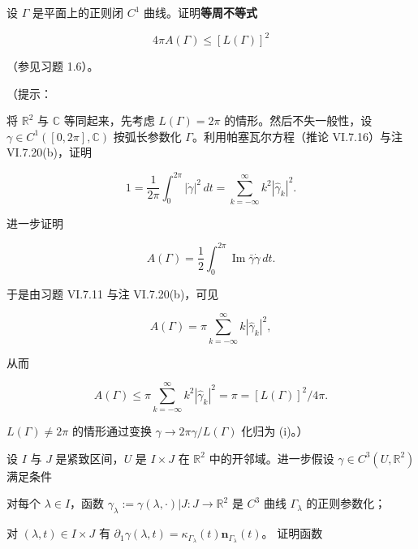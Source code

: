 \begin{exercises}
\item

设 $ \Gamma $ 是平面上的正则闭 $ C^{1} $ 曲线。证明\textbf{等周不等式}

\[
4\pi A(\Gamma) \le [L(\Gamma)]^{2}
\]

（参见习题 1.6）。

（提示：

\begin{subitems}
\item

将 $ \mathbb{R}^{2} $ 与 $ \mathbb{C} $ 等同起来，先考虑 $ L(\Gamma) = 2\pi $ 的情形。然后不失一般性，设 $ \gamma \in C^{1}([0,2\pi], \mathbb{C}) $ 按弧长参数化 $ \Gamma $。利用帕塞瓦尔方程（推论 VI.7.16）与注 VI.7.20(b)，证明

\[
1 = \frac{1}{2\pi}\int_{0}^{2\pi}|\dot\gamma|^{2}\,dt = \sum_{k=-\infty}^{\infty} k^{2}|\hat\gamma_{k}|^{2} .
\]

进一步证明

\[
A(\Gamma) = \frac{1}{2}\int_{0}^{2\pi} \operatorname{Im}\bar\gamma\dot\gamma\,dt .
\]

于是由习题 VI.7.11 与注 VI.7.20(b)，可见

\[
A(\Gamma) = \pi \sum_{k=-\infty}^{\infty} k|\hat\gamma_{k}|^{2} ,
\]

从而

\[
A(\Gamma) \le \pi \sum_{k=-\infty}^{\infty} k^{2}|\hat\gamma_{k}|^{2} = \pi = [L(\Gamma)]^{2}/4\pi .
\]
\item

$ L(\Gamma) \ne 2\pi $ 的情形通过变换 $ \gamma \to 2\pi\gamma/L(\Gamma) $ 化归为 (i)。）

\end{subitems}

\item

设 $ I $ 与 $ J $ 是紧致区间，$ U $ 是 $ I \times J $ 在 $ \mathbb{R}^{2} $ 中的开邻域。进一步假设 $ \gamma \in C^{3}(U, \mathbb{R}^{2}) $ 满足条件

\begin{subitems}
\item

对每个 $ \lambda \in I $，函数 $ \gamma_{\lambda} := \gamma(\lambda,\cdot)|J : J \to \mathbb{R}^{2} $ 是 $ C^{3} $ 曲线 $ \Gamma_{\lambda} $ 的正则参数化；

\item

对 $ (\lambda,t) \in I \times J $ 有 $ \partial_{1}\gamma(\lambda,t) = \kappa_{\Gamma_{\lambda}}(t)\mathbf{n}_{\Gamma_{\lambda}}(t) $。
证明函数


\end{subitems}
\end{exercises}

